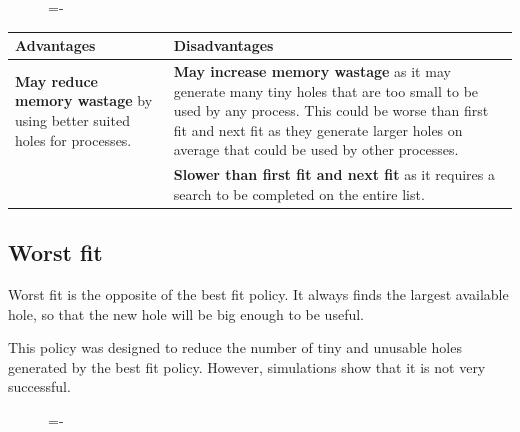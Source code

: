 \documentclass[a4paper]{systems-software}
\begin{document}
\begin{figure}[H]
  \lineskip=-\fboxrule
\end{figure}

\begin{longtabu} to \textwidth {| X[1,l] | X[1,l] |}
    \hline
    \textbf{Advantages} & \textbf{Disadvantages}
	\\ \hline
	\textbf{May reduce memory wastage} by using better suited holes for processes. &
	\textbf{May increase memory wastage} as it may generate many tiny holes that are too small to be used by any process. This could be worse than first fit and next fit as they generate larger holes on average that could be used by other processes.
	\\ \hline
	& \textbf{Slower than first fit and next fit} as it requires a search to be completed on the entire list.
	\\ \hline
\end{longtabu}


\newpage

\subsection*{Worst fit}

Worst fit is the opposite of the best fit policy. It always finds the largest available hole, so that the new hole will be big enough to be useful.

This policy was designed to reduce the number of tiny and unusable holes generated by the best fit policy. However, simulations show that it is not very successful.

\begin{figure}[H]
  \lineskip=-\fboxrule
\end{figure}
\end{document}
